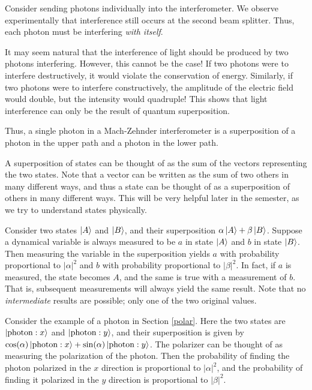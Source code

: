     Consider sending photons individually into the interferometer. We observe experimentally that interference still occurs at the second beam splitter. Thus, each photon must be interfering \textit{with itself}.
    
    \begin{framedrmk*}
        It may seem natural that the interference of light should be produced by two photons interfering. However, this cannot be the case! If two photons were to interfere destructively, it would violate the conservation of energy. Similarly, if two photons were to interfere constructively, the amplitude of the electric field would double, but the intensity would quadruple! This shows that light interference can only be the result of quantum superposition.
    \end{framedrmk*}
    
    Thus, a single photon in a Mach-Zehnder interferometer is a superposition of a photon in the upper path and a photon in the lower path.
    
    \begin{framedrmk*} 
        A superposition of states can be thought of as the sum of the vectors representing the two states. Note that a vector can be written as the sum of two others in many different ways, and thus a state can be thought of as a superposition of others in many different ways. This will be very helpful later in the semester, as we try to understand states physically. 
    \end{framedrmk*} 
    
    Consider two states $\ket{A}$ and $\ket{B}$, and their superposition $\alpha\ket{A}+\beta\ket{B}$. Suppose a dynamical variable is always measured to be $a$ in state $\ket{A}$ and $b$ in state $\ket{B}$. Then measuring the variable in the superposition yields $a$ with probability proportional to $|\alpha|^2$ and $b$ with probability proportional to $|\beta|^2$. In fact, if $a$ is measured, the state becomes $A$, and the same is true with a measurement of $b$. That is, subsequent measurements will always yield the same result. Note that no \emph{intermediate} results are possible; only one of the two original values. 
    
    \begin{framedexpl}
        Consider the example of a photon in Section \ref{polar}. Here the two states are $\ket{\text{photon}:x}$ and $\ket{\text{photon}:y}$, and their superposition is given by $\cos(\alpha)\ket{\text{photon}:x}+\sin(\alpha)\ket{\text{photon}:y}$. The polarizer can be thought of as measuring the polarization of the photon. Then the probability of finding the photon polarized in the $x$ direction is proportional to $|\alpha|^2$, and the probability of finding it polarized in the $y$ direction is proportional to $|\beta|^2$.
    \end{framedexpl}

